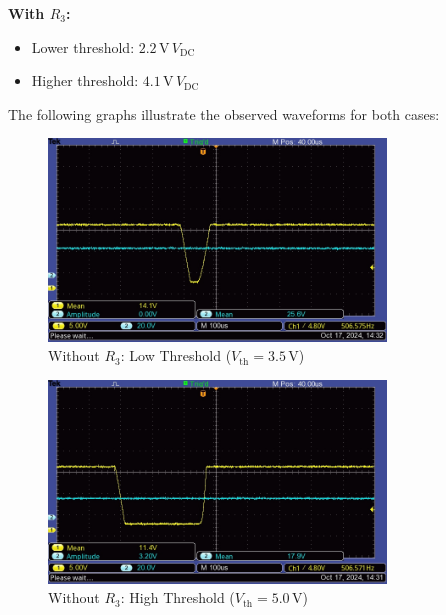 \documentclass{article}
\begin{document}
\textbf{With \( R_3 \):}
\begin{itemize}
    \item Lower threshold: \( 2.2\,\text{V} \, V_{\text{DC}} \)
    \item Higher threshold: \( 4.1\,\text{V} \, V_{\text{DC}} \)
\end{itemize}

The following graphs illustrate the observed waveforms for both cases:

\begin{figure}[H]
    \centering
    \includegraphics[width=0.8\textwidth]{img/Lab 8/noR_High.JPG} %
    \caption{Without \( R_3 \): Low Threshold (\( V_{\text{th}} = 3.5\,\text{V} \))}
\end{figure}

\begin{figure}[H]
    \centering
    \includegraphics[width=0.8\textwidth]{img/Lab 8/noR_Low.JPG} %
    \caption{Without \( R_3 \): High Threshold (\( V_{\text{th}} = 5.0\,\text{V} \))}
\end{figure}
\end{document}
